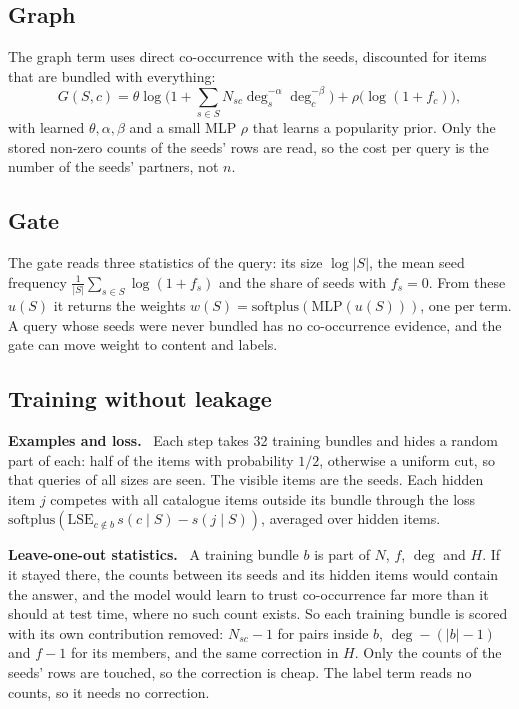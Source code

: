 \documentclass[runningheads]{llncs}
\renewcommand{\paragraph}[1]{\smallskip\noindent\textbf{#1}\ }
\begin{document}
\subsection{Graph}

The graph term uses direct co-occurrence with the seeds, discounted for items that are bundled with everything:
\begin{equation}
G(S,c)=\theta\log\Big(1+\textstyle\sum_{s\in S}N_{sc}\deg_s^{-\alpha}\deg_c^{-\beta}\Big)+\rho\big(\log(1+f_c)\big),
\end{equation}
with learned $\theta,\alpha,\beta$ and a small MLP $\rho$ that learns a popularity prior. Only the stored non-zero
counts of the seeds' rows are read, so the cost per query is the number of the seeds' partners, not $n$.

\subsection{Gate}

The gate reads three statistics of the query: its size $\log|S|$, the mean seed frequency
$\tfrac{1}{|S|}\sum_{s\in S}\log(1+f_s)$ and the share of seeds with $f_s=0$. From these $u(S)$ it returns the weights $w(S)=\mathrm{softplus}(\mathrm{MLP}(u(S)))$, one per term. A query
whose seeds were never bundled has no co-occurrence evidence, and the gate can move weight to content and labels.

\subsection{Training without leakage}

\paragraph{Examples and loss.} Each step takes 32 training bundles and hides a random part of each: half of the items
with probability $1/2$, otherwise a uniform cut, so that queries of all sizes are seen. The visible items are the
seeds. Each hidden item $j$ competes with all catalogue items outside its bundle through the loss
$\mathrm{softplus}(\mathrm{LSE}_{c\notin b}\,s(c\mid S)-s(j\mid S))$, averaged over hidden items.

\paragraph{Leave-one-out statistics.} A training bundle $b$ is part of $N$, $f$, $\deg$ and $H$. If it stayed there,
the counts between its seeds and its hidden items would contain the answer, and the model would learn to trust
co-occurrence far more than it should at test time, where no such count exists. So each training bundle is scored
with its own contribution removed: $N_{sc}-1$ for pairs inside $b$, $\deg-(|b|-1)$ and $f-1$ for its members, and
the same correction in $H$. Only the counts of the seeds' rows are touched, so the correction is cheap.
The label term reads no counts, so it needs no correction.
\end{document}
